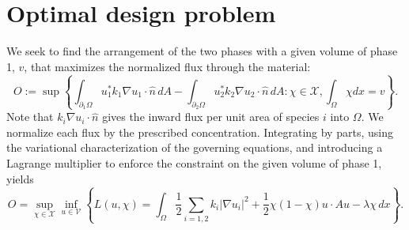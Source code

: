 \documentclass[11pt]{article}
\begin{document}
%
%



\section{Optimal design problem} \label{sec:opt}

We seek to find the arrangement of the two phases with a given volume of phase 1, $v$, that maximizes the normalized flux through the material:
\begin{equation}\label{eq:tp}
O := \sup \left\{
 \int_{\partial_1 \Omega} u_1^* k_1 \nabla u_1 \cdot \hat{n} \, dA - 
 \int_{\partial_2 \Omega} u_2^* k_2 \nabla u_2 \cdot \hat{n} \, dA
: \chi \in {\mathcal X}, \int_\Omega \chi dx = v
\right\} .
\end{equation}
Note that $k_i \nabla u_i \cdot \hat{n}$ gives the inward flux per unit area of species $i$ into $\Omega$.  We normalize each flux by the prescribed concentration.  Integrating by parts, using the variational characterization of the governing equations, and introducing a Lagrange multiplier to enforce the constraint on the given volume of phase 1, yields
\begin{equation}\tag{P} \label{eq:saddle}
O= \sup_{\chi\in \mathcal{X}}\inf_{u\in\mathcal{V}}\left\{L(u,\chi) = \int_\Omega \frac{1}{2} \sum_{i=1,2} k_i |\nabla u_i|^2 + \frac{1}{2} \chi(1-\chi)u \cdot A u -\lambda\chi\,dx\right\}.
\end{equation}
\end{document}
